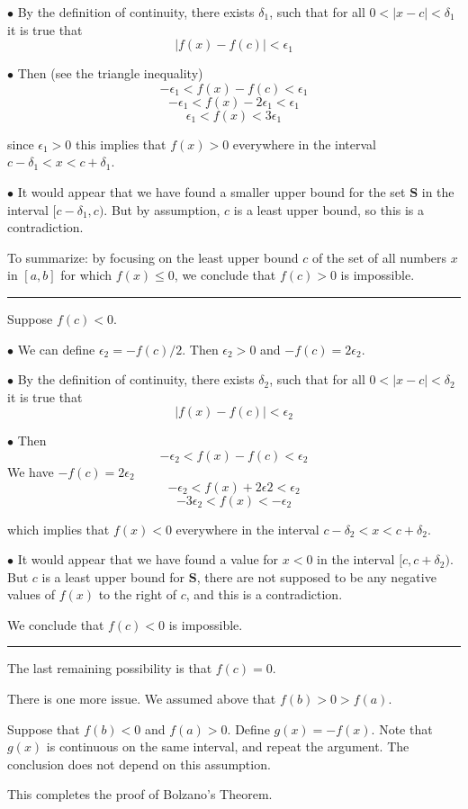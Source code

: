 \documentclass[11pt, oneside]{article}
\begin{document}
$\bullet$  By the definition of continuity, there exists $\delta_1$, such that for all $0 < |x - c| < \delta_1$ it is true that
\[ |f(x) - f(c)| < \epsilon_1 \]

$\bullet$  Then (see the triangle inequality)
\[ -\epsilon_1 < f(x) - f(c) < \epsilon_1 \]
\[ -\epsilon_1 < f(x) - 2 \epsilon_1 < \epsilon_1 \]
\[ \epsilon_1 < f(x) < 3 \epsilon_1 \]

since $\epsilon_1 > 0$ this implies that $f(x) > 0$ everywhere in the interval $c - \delta_1 < x < c + \delta_1$.

$\bullet$  It would appear that we have found a smaller upper bound for the set $\mathbf{S}$ in the interval $[c - \delta_1,c)$.  But by assumption, $c$ is a least upper bound, so this is a contradiction.

To summarize:  by focusing on the least upper bound $c$ of the set of all numbers $x$ in $[a,b]$ for which $f(x) \le 0$, we conclude that $f(c) > 0$ is impossible.

\noindent\rule{2cm}{0.4pt}

Suppose $f(c) < 0$.

$\bullet$  We can define $\epsilon_2 = -f(c)/2$.  Then $\epsilon_2 > 0$ and $-f(c) = 2 \epsilon_2$.

$\bullet$  By the definition of continuity, there exists $\delta_2$, such that for all $0 < |x - c| < \delta_2$ it is true that
\[ |f(x) - f(c)| < \epsilon_2 \]

$\bullet$  Then
\[ -\epsilon_2 < f(x) - f(c) < \epsilon_2 \]
We have $-f(c) = 2 \epsilon_2$
\[ -\epsilon_2 < f(x) + 2 \epsilon2 < \epsilon_2 \]
\[ -3\epsilon_2 < f(x) < -\epsilon_2 \]

which implies that $f(x) < 0$ everywhere in the interval $c - \delta_2 < x < c + \delta_2$.

$\bullet$  It would appear that we have found a value for $x < 0$ in the interval $[c, c + \delta_2)$.  But $c$ is a least upper bound for $\mathbf{S}$, there are not supposed to be any negative values of $f(x)$ to the right of $c$, and this is a contradiction.  

We conclude that $f(c) < 0$ is impossible.

\noindent\rule{2cm}{0.4pt}

The last remaining possibility is that $f(c) = 0$.

There is one more issue.  We assumed above that $f(b) > 0 > f(a)$.

Suppose that $f(b) < 0$ and $f(a) > 0$.  Define $g(x) = -f(x)$.  Note that $g(x)$ is continuous on the same interval, and repeat the argument.  The conclusion does not depend on this assumption.

This completes the proof of Bolzano's Theorem.
\end{document}
